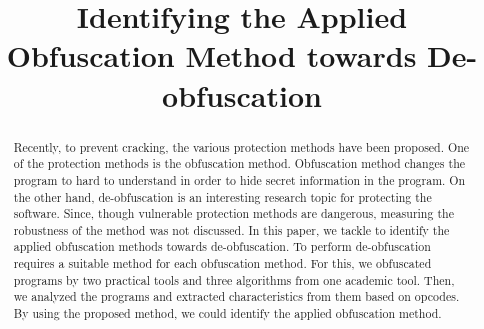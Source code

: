 \documentclass[conference]{IEEEtran}
\begin{document}
\title{Identifying the Applied Obfuscation Method towards De-obfuscation}

\author{
\and
{}
}

\maketitle

\begin{abstract}
  Recently, to prevent cracking, the various protection methods have
  been proposed.  One of the protection methods is the obfuscation
  method. Obfuscation method changes the program to hard to understand
  in order to hide secret information in the program.
  On the other hand, de-obfuscation is an interesting research topic
  for protecting the software.  Since, though vulnerable protection
  methods are dangerous, measuring the robustness of the method was not
  discussed.
  In this paper, we tackle to identify the applied obfuscation methods
  towards de-obfuscation.  To perform de-obfuscation requires a
  suitable method for each obfuscation method.  For this, we
  obfuscated programs by two practical tools and three algorithms from
  one academic tool.  Then, we analyzed the programs and extracted
  characteristics from them based on opcodes.  By using the proposed
  method, we could identify the applied obfuscation method.

\end{abstract}
\end{document}
